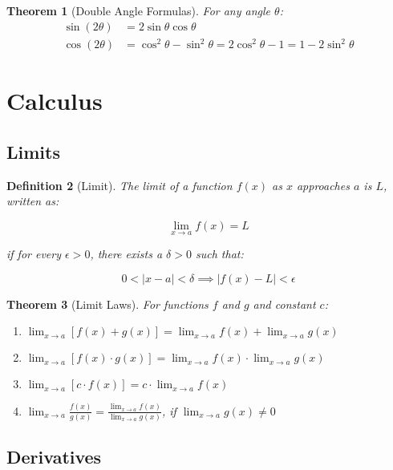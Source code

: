 \documentclass[12pt]{article}
\newif\ifDarkMode
\newcommand{\eqcolor}[1]{\ifDarkMode\textcolor{draculaPurple}{#1}\else#1\fi}
\newcommand{\varcolor}[1]{\ifDarkMode\textcolor{draculaGreen}{#1}\else#1\fi}
\newtheorem{theorem}{Theorem}[section]
\newtheorem{definition}[theorem]{Definition}
\begin{document}
\begin{theorem}[Double Angle Formulas]
For any angle $\varcolor{\theta}$:
\begin{align*}
\eqcolor{\sin(2\theta)} &= \eqcolor{2\sin \theta \cos \theta} \\
\eqcolor{\cos(2\theta)} &= \eqcolor{\cos^2 \theta - \sin^2 \theta = 2\cos^2 \theta - 1 = 1 - 2\sin^2 \theta}
\end{align*}
\end{theorem}

\section{\textcolor{draculaCyan}{Calculus}}

\subsection{\textcolor{draculaYellow}{Limits}}

\begin{definition}[Limit]
The limit of a function $\varcolor{f(x)}$ as $\varcolor{x}$ approaches $\varcolor{a}$ is $\varcolor{L}$, written as:

\[
\eqcolor{\lim_{x \to a} f(x) = L}
\]

if for every $\varcolor{\epsilon > 0}$, there exists a $\varcolor{\delta > 0}$ such that:

\[
\eqcolor{0 < |x - a| < \delta \implies |f(x) - L| < \epsilon}
\]
\end{definition}

\begin{theorem}[Limit Laws]
For functions $\varcolor{f}$ and $\varcolor{g}$ and constant $\varcolor{c}$:
\begin{enumerate}
    \item $\eqcolor{\lim_{x \to a} [f(x) + g(x)] = \lim_{x \to a} f(x) + \lim_{x \to a} g(x)}$
    \item $\eqcolor{\lim_{x \to a} [f(x) \cdot g(x)] = \lim_{x \to a} f(x) \cdot \lim_{x \to a} g(x)}$
    \item $\eqcolor{\lim_{x \to a} [c \cdot f(x)] = c \cdot \lim_{x \to a} f(x)}$
    \item $\eqcolor{\lim_{x \to a} \frac{f(x)}{g(x)} = \frac{\lim_{x \to a} f(x)}{\lim_{x \to a} g(x)}}$, if $\eqcolor{\lim_{x \to a} g(x) \neq 0}$
\end{enumerate}
\end{theorem}

\subsection{\textcolor{draculaYellow}{Derivatives}}
\end{document}
